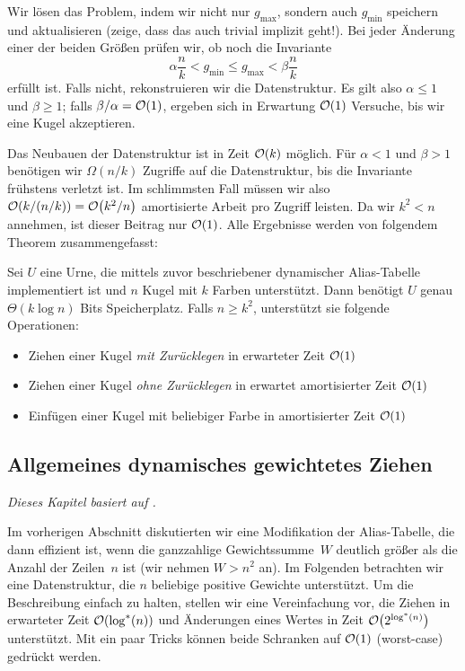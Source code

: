 Wir lösen das Problem, indem wir nicht nur $g_{\text{max}}$, sondern auch $g_{\text{min}}$ speichern und aktualisieren (zeige, dass das auch trivial implizit geht!).
Bei jeder Änderung einer der beiden Größen prüfen wir, ob noch die Invariante
\begin{equation}
    \alpha \frac n k < g_{\text{min}} \le g_{\text{max}} < \beta \frac n k
\end{equation}
erfüllt ist.
Falls nicht, rekonstruieren wir die Datenstruktur.
Es gilt also $\alpha \le 1$ und $\beta \ge 1$; falls $\beta / \alpha = \mathcal{O}\!\left(1\right)$, ergeben sich in Erwartung $\mathcal{O}\!\left(1\right)$ Versuche, bis wir eine Kugel akzeptieren.

Das Neubauen der Datenstruktur ist in Zeit $\mathcal{O}\!\left(k\right)$ möglich.
Für $\alpha < 1$ und $\beta > 1$ benötigen wir $\Omega(n / k)$ Zugriffe auf die Datenstruktur, bis die Invariante frühstens verletzt ist.
Im schlimmsten Fall müssen wir also $\mathcal{O}\!\left(k / (n / k)\right) = \mathcal{O}\!\left(k^2 / n\right)$ amortisierte Arbeit pro Zugriff leisten.
Da wir $k^2 < n$ annehmen, ist dieser Beitrag nur $\mathcal{O}\!\left(1\right)$.
Alle Ergebnisse werden von folgendem Theorem zusammengefasst:

\begin{theorem}
    Sei $U$ eine Urne, die mittels zuvor beschriebener dynamischer Alias-Tabelle implementiert ist und $n$ Kugel mit $k$ Farben unterstützt.
    Dann benötigt $U$ genau $\Theta(k \log n)$ Bits Speicherplatz.
    Falls $n \ge k^2$, unterstützt sie folgende Operationen:
    \begin{itemize}
        \item Ziehen einer Kugel \emph{mit Zurücklegen} in erwarteter Zeit $\mathcal{O}\!\left(1\right)$
        \item Ziehen einer Kugel \emph{ohne Zurücklegen} in erwartet amortisierter Zeit $\mathcal{O}\!\left(1\right)$
        \item Einfügen einer Kugel mit beliebiger Farbe in amortisierter Zeit $\mathcal{O}\!\left(1\right)$ \qedhere
    \end{itemize}
\end{theorem}

\goodbreak

\subsection{Allgemeines dynamisches gewichtetes Ziehen}
\label{subsec:matias}
\emph{Dieses Kapitel basiert auf \cite{DBLP:journals/mst/MatiasVN03}.}

\bigskip
\def\lgs{\ensuremath{\log^*}}

Im vorherigen Abschnitt diskutierten wir eine Modifikation der Alias-Tabelle, die dann effizient ist, wenn die ganzzahlige Gewichtssumme~$W$ deutlich größer als die Anzahl der Zeilen~$n$ ist (wir nehmen $W > n^2$ an).
Im Folgenden betrachten wir eine Datenstruktur, die $n$ beliebige positive Gewichte unterstützt.
Um die Beschreibung einfach zu halten, stellen wir eine Vereinfachung vor, die Ziehen in erwarteter Zeit $\Oh{\lgs(n)}$ und Änderungen eines Wertes in Zeit $\Oh{2^{\lgs(n)}}$ unterstützt.
Mit ein paar Tricks können beide Schranken auf $\mathcal{O}\!\left(1\right)$ (worst-case) gedrückt werden.

